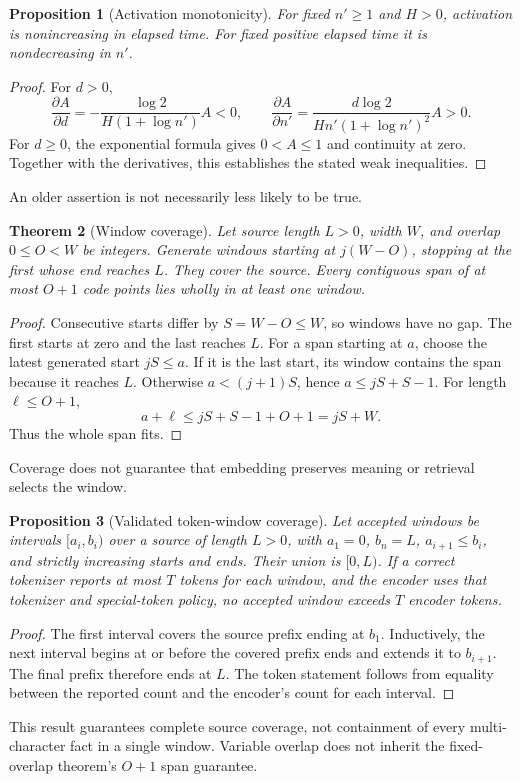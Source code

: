 \documentclass[11pt]{article}
\newtheorem{theorem}{Theorem}
\newtheorem{proposition}[theorem]{Proposition}
\begin{document}
\begin{proposition}[Activation monotonicity]
For fixed $n'\geq1$ and $H>0$, activation is nonincreasing in elapsed time. For fixed positive elapsed time it is nondecreasing in $n'$.
\end{proposition}
\begin{proof}
For $d>0$,
\[
 \frac{\partial A}{\partial d}
 =-\frac{\log2}{H(1+\log n')}A<0,\qquad
 \frac{\partial A}{\partial n'}
 =\frac{d\log2}{Hn'(1+\log n')^2}A>0.
\]
For $d\geq0$, the exponential formula gives $0<A\leq1$ and continuity at zero. Together with the derivatives, this establishes the stated weak inequalities.
\end{proof}
An older assertion is not necessarily less likely to be true.

\begin{theorem}[Window coverage]
Let source length $L>0$, width $W$, and overlap $0\leq O<W$ be integers. Generate windows starting at $j(W-O)$, stopping at the first whose end reaches $L$. They cover the source. Every contiguous span of at most $O+1$ code points lies wholly in at least one window.
\end{theorem}
\begin{proof}
Consecutive starts differ by $S=W-O\leq W$, so windows have no gap. The first starts at zero and the last reaches $L$. For a span starting at $a$, choose the latest generated start $jS\leq a$. If it is the last start, its window contains the span because it reaches $L$. Otherwise $a<(j+1)S$, hence $a\leq jS+S-1$. For length $\ell\leq O+1$,
\[
 a+\ell\leq jS+S-1+O+1=jS+W.
\]
Thus the whole span fits.
\end{proof}
Coverage does not guarantee that embedding preserves meaning or retrieval selects the window.


\begin{proposition}[Validated token-window coverage]
Let accepted windows be intervals $[a_i,b_i)$ over a source of length $L>0$, with $a_1=0$, $b_n=L$, $a_{i+1}\leq b_i$, and strictly increasing starts and ends. Their union is $[0,L)$. If a correct tokenizer reports at most $T$ tokens for each window, and the encoder uses that tokenizer and special-token policy, no accepted window exceeds $T$ encoder tokens.
\end{proposition}
\begin{proof}
The first interval covers the source prefix ending at $b_1$. Inductively, the next interval begins at or before the covered prefix ends and extends it to $b_{i+1}$. The final prefix therefore ends at $L$. The token statement follows from equality between the reported count and the encoder's count for each interval.
\end{proof}
This result guarantees complete source coverage, not containment of every multi-character fact in a single window. Variable overlap does not inherit the fixed-overlap theorem's $O+1$ span guarantee.
\end{document}
